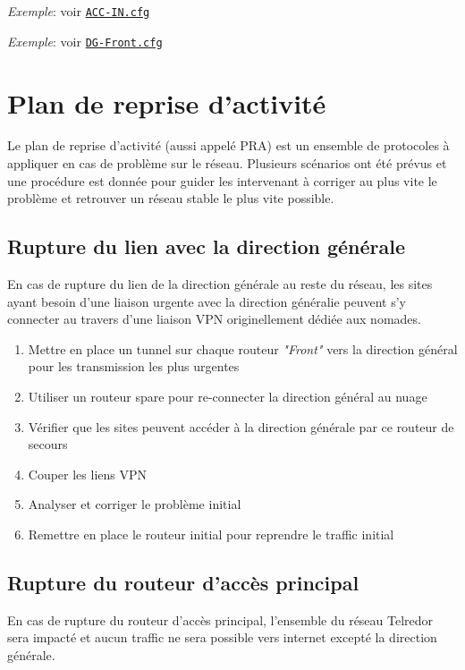 \documentclass{article}
\newcommand{\tlr}{Telredor\xspace}
\newcommand{\seefile}[1]{
  \begin{center}
  \begin{minipage}{0.9\textwidth}
    \emph{Exemple}: voir \texttt{\href{https://github.com/EpicKiwi/Wide-Network-Project-Cesi-A4/blob/master/network/#1}{#1}}
  \end{minipage}
  \end{center}
}
\begin{document}
\seefile{ACC-IN.cfg}
\seefile{DG-Front.cfg}

\section{Plan de reprise d'activité}

Le plan de reprise d'activité (aussi appelé PRA) est un ensemble de protocoles à appliquer en cas de problème sur le réseau.
Plusieurs scénarios ont été prévus et une procédure est donnée pour guider les intervenant à corriger au plus vite le problème et retrouver un réseau stable le plus vite possible.

\subsection{Rupture du lien avec la direction générale}

En cas de rupture du lien de la direction générale au reste du réseau, les sites ayant besoin d'une liaison urgente avec la direction généralie peuvent s'y connecter au travers d'une liaison VPN originellement dédiée aux nomades.

\bigskip

\begin{enumerate}
\item Mettre en place un tunnel sur chaque routeur \emph{"Front"} vers la direction général pour les transmission les plus urgentes
\item Utiliser un routeur spare pour re-connecter la direction général au nuage
\item Vérifier que les sites peuvent accéder à la direction générale par ce routeur de secours
\item Couper les liens VPN
\item Analyser et corriger le problème initial
\item Remettre en place le routeur initial pour reprendre le traffic initial
\end{enumerate}

\subsection{Rupture du routeur d'accès principal}

En cas de rupture du routeur d'accès principal, l'ensemble du réseau \tlr sera impacté et aucun traffic ne sera possible vers internet excepté la direction générale.

\bigskip
\end{document}
